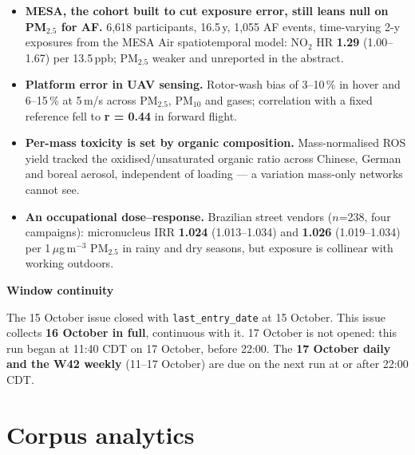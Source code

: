 \documentclass[10pt]{article}
\begin{document}
\footnotesize
\begin{itemize}

\item \textbf{MESA, the cohort built to cut exposure error, still leans null on PM$_{2.5}$ for AF.} 6,618 participants,
16.5\,y, 1,055 AF events, time-varying 2-y exposures from the MESA Air spatiotemporal model: NO$_2$ HR
\textbf{1.29} (1.00--1.67) per 13.5\,ppb; PM$_{2.5}$ weaker and unreported in the abstract.

\item \textbf{Platform error in UAV sensing.} Rotor-wash bias of 3--10\,\% in hover and 6--15\,\% at 5\,m/s across
PM$_{2.5}$, PM$_{10}$ and gases; correlation with a fixed reference fell to \textbf{r = 0.44} in forward flight.

\item \textbf{Per-mass toxicity is set by organic composition.} Mass-normalised ROS yield tracked the
oxidised/unsaturated organic ratio across Chinese, German and boreal aerosol, independent of loading --- a
variation mass-only networks cannot see.

\item \textbf{An occupational dose--response.} Brazilian street vendors ($n$=238, four campaigns): micronucleus IRR
\textbf{1.024} (1.013--1.034) and \textbf{1.026} (1.019--1.034) per 1\,$\mu$g\,m$^{-3}$ PM$_{2.5}$ in rainy and dry
seasons, but exposure is collinear with working outdoors.

\end{itemize}

\vspace{2mm}

\begin{keybox}
{\sffamily\bfseries\footnotesize\color{Deep}Window continuity}\\[1.2mm]
{\fontsize{7.2}{8.8}\selectfont
The 15 October issue closed with \texttt{last\_entry\_date} at 15 October. This issue collects
\textbf{16 October in full}, continuous with it. 17 October is not opened: this run began at 11:40 CDT on
17 October, before 22:00. The \textbf{17 October daily and the W42 weekly} (11--17 October) are due on the next
run at or after 22:00 CDT.\par}
\end{keybox}

\vspace{3mm}
\par{}\baselineskip{}\baselineskip
\section*{\sffamily\bfseries\color{Deep}Corpus analytics}
\vspace{-1.5mm}{\color{Amber}\rule{\linewidth}{1.1pt}}\vspace{2.5mm}
\end{document}
